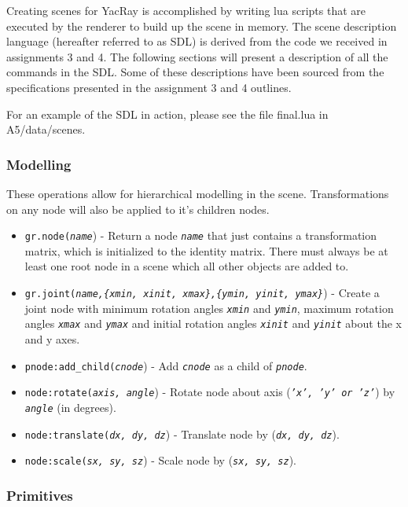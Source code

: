 \documentclass[12pt]{article}
\begin{document}
Creating scenes for YacRay is accomplished by writing lua scripts that are executed by the renderer to build up the scene in memory. The scene description language (hereafter referred to as SDL) is derived from the code we received in assignments 3 and 4. The following sections will present a description of all the commands in the SDL. Some of these descriptions have been sourced from the specifications presented in the assignment 3 and 4 outlines\cite{A3}\cite{A4}.

For an example of the SDL in action, please see the file final.lua in A5/data/scenes.

\subsubsection{Modelling}

These operations allow for hierarchical modelling in the scene. Transformations on any node will also be applied to it's children nodes.

\begin{itemize} \itemsep1pt \parskip0pt 
\item{\texttt{gr.node(\textit{name}}) - Return a node \textit{\texttt{name}} that just contains a transformation matrix, which is initialized to the identity matrix. There must always be at least one root node in a scene which all other objects are added to.}
\item{\texttt{gr.joint(\textit{name,\{xmin, xinit, xmax\},\{ymin, yinit, ymax\}}}) - Create a joint node with minimum rotation angles \textit{\texttt{xmin}} and \textit{\texttt{ymin}}, maximum rotation angles \textit{\texttt{xmax}} and \textit{\texttt{ymax}} and initial rotation angles \textit{\texttt{xinit}} and \textit{\texttt{yinit}} about the x and y axes.}
\item{\texttt{pnode:add\_child(\textit{cnode}}) - Add \textit{\texttt{cnode}} as a child of \textit{\texttt{pnode}}.}
\item{\texttt{node:rotate(\textit{axis, angle}}) - Rotate node about axis (\texttt{\textit{'x', 'y' or 'z'}}) by \textit{\texttt{angle}} (in degrees).}
\item{\texttt{node:translate(\textit{dx, dy, dz}}) - Translate node by (\texttt{\textit{dx, dy, dz}}).}
\item{\texttt{node:scale(\textit{sx, sy, sz}}) - Scale node by (\texttt{\textit{sx, sy, sz}}).}
\end{itemize}

\subsubsection{Primitives}
\end{document}
